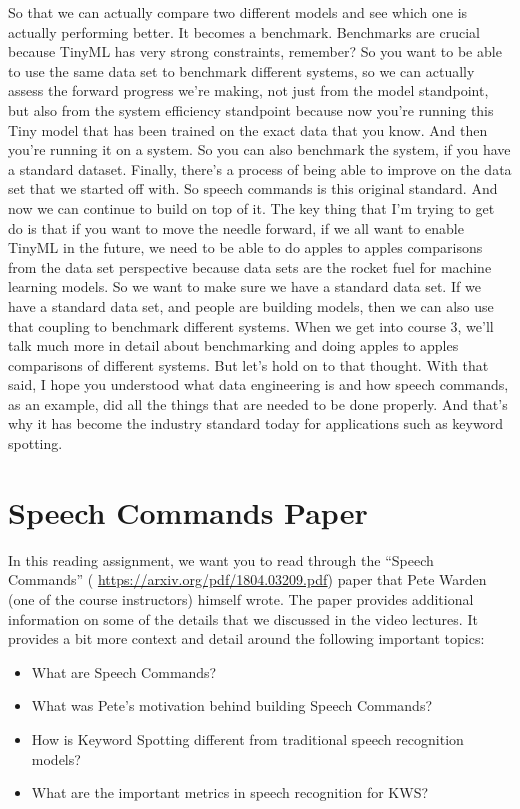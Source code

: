 So that we can actually compare two different models
and see which one is actually performing better.
It becomes a benchmark.
Benchmarks are crucial because TinyML has very strong constraints, remember?
So you want to be able to use the same data set
to benchmark different systems, so we can actually
assess the forward progress we're making, not just from the model
standpoint, but also from the system efficiency standpoint
because now you're running this Tiny model that has been trained
on the exact data that you know.
And then you're running it on a system.
So you can also benchmark the system, if you have a standard dataset.
Finally, there's a process of being able to improve on the data set
that we started off with.
So speech commands is this original standard.
And now we can continue to build on top of it.
The key thing that I'm trying to get do is
that if you want to move the needle forward,
if we all want to enable TinyML in the future,
we need to be able to do apples to apples comparisons from the data set
perspective because data sets are the rocket fuel for machine learning
models.
So we want to make sure we have a standard data set.
If we have a standard data set, and people are building models,
then we can also use that coupling to benchmark different systems.
When we get into course 3, we'll talk much more in detail
about benchmarking and doing apples to apples
comparisons of different systems.
But let's hold on to that thought.
With that said, I hope you understood what data engineering is
and how speech commands, as an example, did all the things that
are needed to be done properly.
And that's why it has become the industry standard today
for applications such as keyword spotting.

\section{Speech Commands Paper}

In this reading assignment, we want you to read through the ``Speech Commands'' ( \url{https://arxiv.org/pdf/1804.03209.pdf}) paper that Pete Warden (one of the course instructors) himself wrote. The paper provides additional information on some of the details that we discussed in the video lectures. It provides a bit more context and detail around the following important topics:

\begin{itemize}
  \item What are Speech Commands?
  \item What was Pete’s motivation behind building Speech Commands?
  \item How is Keyword Spotting different from traditional speech recognition models? 
  \item What are the important metrics in speech recognition for KWS?
\end{itemize}

